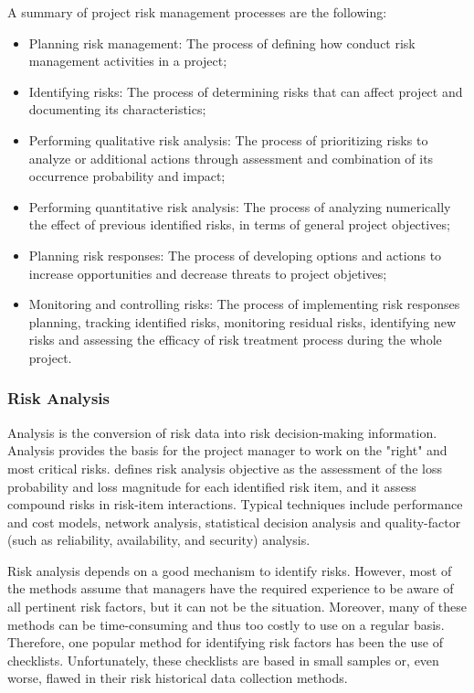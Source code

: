 \documentclass[a4paper,twoside]{article}
\begin{document}
A summary of project risk management processes are the following:
\begin{itemize}
\item Planning risk management: The process of defining how conduct risk management activities in a project;
\item Identifying risks: The process of determining risks that can affect project and documenting its characteristics;
\item Performing qualitative risk analysis: The process of prioritizing risks to analyze or additional actions through assessment and combination of its occurrence probability and impact;
\item Performing quantitative risk analysis: The process of analyzing numerically the effect of previous identified risks, in terms of general project objectives;
\item Planning risk responses: The process of developing options and actions to increase opportunities and decrease threats to project objetives;
\item Monitoring and controlling risks: The process of implementing risk responses planning, tracking identified risks, monitoring residual risks, identifying new risks and assessing the efficacy of risk treatment process during the whole project.
\end{itemize}

\subsubsection{Risk Analysis}

\noindent Analysis is the conversion of risk data into risk decision-making information. Analysis provides the basis for the project manager to work on the "right" and most critical risks. \cite{BOEHM1991} defines risk analysis objective as the assessment of the loss probability and loss magnitude for each identified risk item, and it assess compound risks in risk-item interactions. Typical techniques include performance and cost models, network analysis, statistical decision analysis and quality-factor (such as reliability, availability, and security) analysis.

Risk analysis depends on a good mechanism to identify risks. However, most of the methods assume that managers have the required experience to be aware of all pertinent risk factors, but it can not be the situation. Moreover, many of these methods can be time-consuming and thus too costly to use on a regular basis. Therefore, one popular method for identifying risk factors has been the use of checklists. Unfortunately, these checklists are based in small samples or, even worse, flawed in their risk historical data collection methods.
\end{document}

